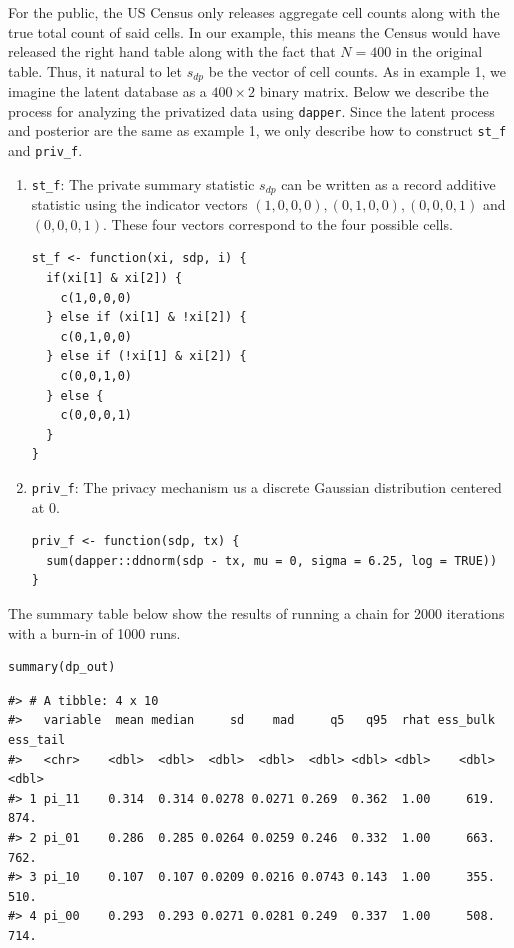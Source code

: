 For the public, the US Census only releases aggregate cell counts along with
the true total count of said cells. In our example,
this means the Census would have released the right hand
table along with the fact that \(N = 400\) in the original
table. Thus, it natural to let \(s_{dp}\) be the vector of cell counts. As in
example 1, we imagine the latent database as a
\(400 \times 2\) binary matrix. Below
we describe the process for analyzing the privatized
data using \texttt{dapper}. Since the latent process
and posterior are the same as example 1, we only describe
how to construct \texttt{st\_f} and \texttt{priv\_f}.

\begin{enumerate}
\def\labelenumi{\arabic{enumi}.}
\item
  \texttt{st\_f}: The private summary statistic \(s_{dp}\) can be written as a record additive
  statistic using the indicator vectors \((1,0,0,0), (0,1,0,0), (0,0,0,1)\) and \((0,0,0,1)\).
  These four vectors correspond to the four possible cells.

\begin{verbatim}
st_f <- function(xi, sdp, i) {
  if(xi[1] & xi[2]) {
    c(1,0,0,0)
  } else if (xi[1] & !xi[2]) {
    c(0,1,0,0)
  } else if (!xi[1] & xi[2]) {
    c(0,0,1,0)
  } else {
    c(0,0,0,1)
  }
}
\end{verbatim}
\item
  \texttt{priv\_f}: The privacy mechanism us a discrete Gaussian distribution centered
  at 0.

\begin{verbatim}
priv_f <- function(sdp, tx) {
  sum(dapper::ddnorm(sdp - tx, mu = 0, sigma = 6.25, log = TRUE))
}
\end{verbatim}
\end{enumerate}

The summary table below show the results of running a chain for 2000 iterations with a burn-in of 1000 runs.

\begin{verbatim}
summary(dp_out)
\end{verbatim}

\begin{verbatim}
#> # A tibble: 4 x 10
#>   variable  mean median     sd    mad     q5   q95  rhat ess_bulk ess_tail
#>   <chr>    <dbl>  <dbl>  <dbl>  <dbl>  <dbl> <dbl> <dbl>    <dbl>    <dbl>
#> 1 pi_11    0.314  0.314 0.0278 0.0271 0.269  0.362  1.00     619.     874.
#> 2 pi_01    0.286  0.285 0.0264 0.0259 0.246  0.332  1.00     663.     762.
#> 3 pi_10    0.107  0.107 0.0209 0.0216 0.0743 0.143  1.00     355.     510.
#> 4 pi_00    0.293  0.293 0.0271 0.0281 0.249  0.337  1.00     508.     714.
\end{verbatim}

